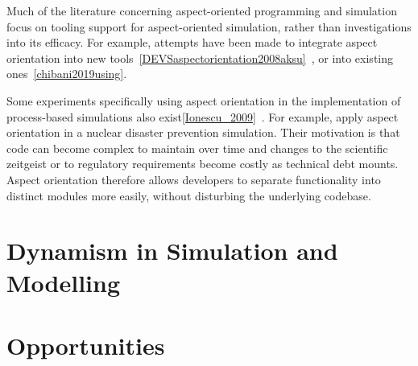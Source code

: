 Much of the literature concerning aspect-oriented programming and simulation
focus on tooling support for aspect-oriented simulation, rather than
investigations into its efficacy. For example, attempts have been made to
integrate aspect orientation into new
tools~\cref{DEVSaspectorientation2008aksu}~,
or into existing ones~\cref{chibani2019using}. 

Some experiments specifically using aspect orientation in the implementation of
process-based simulations also exist\cref{Ionescu_2009}~. For
example, \citeauthor{Ionescu_2009} apply aspect orientation in a nuclear
disaster prevention simulation. Their motivation is that code can become complex
to maintain over time and changes to the scientific zeitgeist or to regulatory
requirements become costly as technical debt mounts. Aspect orientation
therefore allows developers to separate functionality into distinct modules more
easily, without disturbing the underlying codebase.




\section{Dynamism in Simulation and Modelling}





\section{Opportunities}

